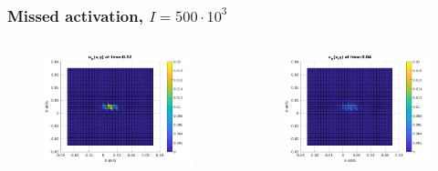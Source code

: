 \documentclass[8pt]{beamer}
\begin{document}
\begin{frame}
	\frametitle{Missed activation, $I = 500\cdot 10^3$}
	\begin{columns}
		\begin{column}{0.25\textwidth}
			\begin{figure}[h]
				\includegraphics[width=\textwidth]{tc1-1/002.jpg}
			\end{figure}
		\end{column}
		\begin{column}{0.25\textwidth}
			\begin{figure}[h]
				\includegraphics[width=\textwidth]{tc1-1/004.jpg}
			\end{figure}
		\end{column}

\end{columns}
\end{frame}
\end{document}
